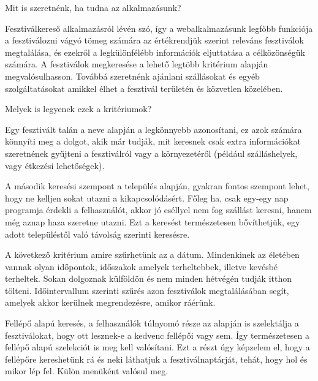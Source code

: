 


Mit is szeretnénk, ha tudna az alkalmazásunk?

Fesztiválkereső alkalmazásról lévén szó, így a webalkalmazásunk legfőbb funkciója a fesztiválozni vágyó tömeg számára az értékrendjük szerint releváns fesztiválok megtalálása, és ezekről a legkülönfélébb információk eljuttatása a célközönségük számára. A fesztiválok megkeresése a lehető legtöbb kritérium alapján megvalósulhasson. Továbbá szeretnénk ajánlani szállásokat és egyéb szolgáltatásokat amikkel élhet a fesztivál területén és közvetlen közelében.

Melyek is legyenek ezek a kritériumok?

Egy fesztivált talán a neve alapján a legkönnyebb azonosítani, ez azok számára könnyíti meg a dolgot, akik már tudják, mit keresnek csak extra információkat szeretnének gyűjteni a fesztiválról vagy a környezetéről (például szálláshelyek, vagy étkezési lehetőségek).

A második keresési szempont a település alapján, gyakran fontos szempont lehet, hogy ne kelljen sokat utazni a kikapcsolódásért. Főleg ha, csak egy-egy nap programja érdekli a felhasználót, akkor jó eséllyel nem fog szállást keresni, hanem még aznap haza szeretne utazni. Ezt a keresést természetesen bővíthetjük, egy adott településtől való távolság szerinti keresésre.

A következő kritérium amire szűrhetünk az a dátum. Mindenkinek az életében vannak olyan időpontok, időszakok amelyek terheltebbek, illetve kevésbé terheltek. Sokan dolgoznak külföldön és nem minden hétvégén tudják itthon tölteni. Időintervallum szerinti szűrés azon fesztiválok megtalálásában segít, amelyek akkor kerülnek megrendezésre, amikor ráérünk.

Fellépő alapú keresés, a felhasználók túlnyomó része az alapján is szelektálja a fesztiválokat, hogy ott lesznek-e a kedvenc fellépői vagy sem. Így természetesen a fellépő alapú szelekciót is meg kell valósítani. Ezt a részt úgy képzelem el, hogy a fellépőre kereshetünk rá és neki láthatjuk a fesztiválnaptárját, tehát, hogy hol és mikor lép fel. Külön menüként valósul meg.

